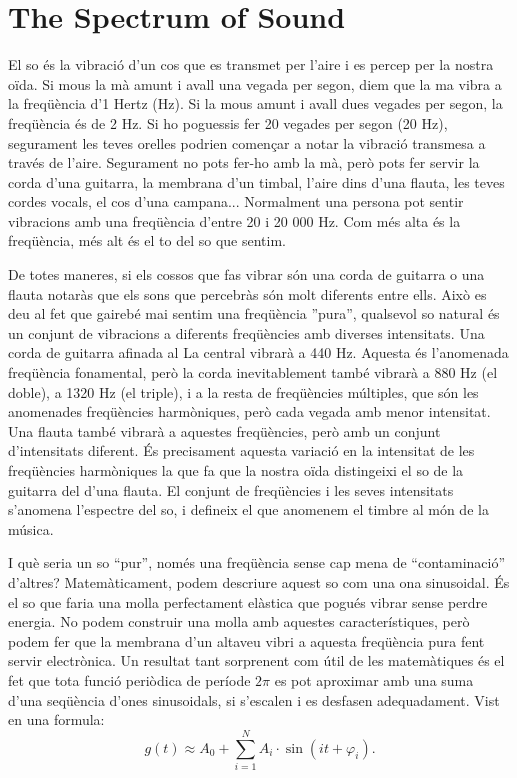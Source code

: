 \section{The Spectrum of Sound}

El so és la vibració d'un cos que es transmet per l'aire i es percep per la nostra oïda. Si mous la mà amunt i avall una vegada per segon, diem que la ma vibra a la freqüència d'1 Hertz (Hz). Si la mous amunt i avall dues vegades per segon, la freqüència és de 2 Hz. Si ho poguessis fer 20 vegades per segon (20 Hz), segurament les teves orelles podrien començar a notar la vibració transmesa a través de l'aire. Segurament no pots fer-ho amb la mà, però pots fer servir la corda d'una guitarra, la membrana d'un timbal, l'aire dins d'una flauta, les teves cordes vocals, el cos d'una campana... Normalment una persona pot sentir vibracions amb una freqüència d'entre 20 i 20 000 Hz. Com més alta és la freqüència, més alt és el to del so que sentim.

De totes maneres, si els cossos que fas vibrar són una corda de guitarra o una flauta notaràs que els sons que percebràs són molt diferents entre ells. Això es deu al fet que gairebé mai sentim una freqüència ''pura'', qualsevol so natural és un conjunt de vibracions a diferents freqüències amb diverses intensitats. Una corda de guitarra afinada al La central vibrarà a 440 Hz. Aquesta és l'anomenada freqüència fonamental, però la corda inevitablement també vibrarà a 880 Hz (el doble), a 1320 Hz (el triple), i a la resta de freqüències múltiples, que són les anomenades freqüències harmòniques, però cada vegada amb menor intensitat. Una flauta també vibrarà a aquestes freqüències, però amb un conjunt d'intensitats diferent. És precisament aquesta variació en la intensitat de les freqüències harmòniques la que fa que la nostra oïda distingeixi el so de la guitarra del d'una flauta. El conjunt de freqüències i les seves intensitats s'anomena l'espectre del so, i defineix el que anomenem el timbre al món de la música.

I què seria un so ``pur'', només una freqüència sense cap mena de ``contaminació'' d'altres? Matemàticament, podem descriure aquest so com una ona sinusoidal. És el so que faria una molla perfectament elàstica que pogués vibrar sense perdre energia. No podem construir una molla amb aquestes característiques, però podem fer que la membrana d'un altaveu vibri a aquesta freqüència pura fent servir electrònica. Un resultat tant sorprenent com útil de les matemàtiques és el fet que tota funció periòdica de període $2\pi$ es pot aproximar amb una suma d'una seqüència d'ones sinusoidals, si s'escalen i es desfasen adequadament. Vist en una formula:
$$g(t) \approx A_0 + \sum_{i=1}^N A_i \cdot \sin(i t + \varphi_i).$$

